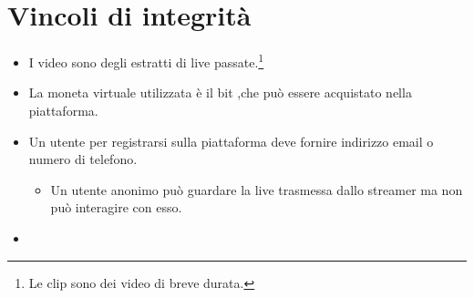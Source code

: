\section{Vincoli di integrità}
\begin{itemize}
    \item I video sono degli estratti di live passate.\footnote{Le clip sono dei video di breve durata.}
    \item La moneta virtuale utilizzata è il bit ,che può essere acquistato nella piattaforma.
    \item Un utente per registrarsi sulla piattaforma deve fornire indirizzo email o numero di telefono.
    \begin{itemize}
        \item Un utente anonimo può guardare la live trasmessa dallo streamer ma non può interagire con esso. 
    \end{itemize}
        \item 
\end{itemize}